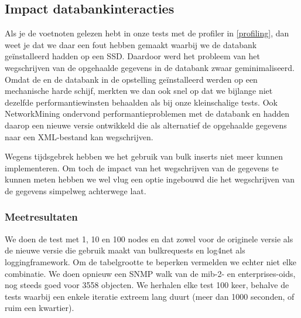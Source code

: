 \subsection{Impact databankinteracties}

Als je de voetnoten gelezen hebt in onze tests met de profiler in \cref{profiling},
dan weet je dat we daar een fout hebben gemaakt waarbij we de databank geïnstalleerd hadden op een SSD.
Daardoor werd het probleem van het wegschrijven van de opgehaalde gegevens in de databank zwaar geminimaliseerd.
Omdat de \nwmretriever{} en de databank in de \vwall{}opstelling geïnstalleerd werden op een mechanische harde schijf,
merkten we dan ook snel op dat we bijlange niet dezelfde performantiewinsten behaalden als bij onze kleinschalige tests.
Ook NetworkMining ondervond performantieproblemen met de databank en hadden daarop een nieuwe versie ontwikkeld die als alternatief
de opgehaalde gegevens naar een XML-bestand kan wegschrijven.

Wegens tijdsgebrek hebben we het gebruik van bulk inserts niet meer kunnen implementeren.
Om toch de impact van het wegschrijven van de gegevens te kunnen meten hebben we wel vlug een optie ingebouwd
die het wegschrijven van de gegevens simpelweg achterwege laat.

\subsubsection{Meetresultaten}

We doen de test met 1, 10 en 100 nodes en dat zowel voor de originele versie als de nieuwe versie die gebruik maakt van bulkrequests en log4net als loggingframework.
Om de tabelgrootte te beperken vermelden we echter niet elke combinatie.
We doen opnieuw een SNMP walk van de mib-2- en enterprises-\glspl{oid}, nog steeds goed voor 3558 objecten.
We herhalen elke test 100 keer, behalve de tests waarbij een enkele iteratie extreem lang duurt (meer dan 1000 seconden, of ruim een kwartier).

